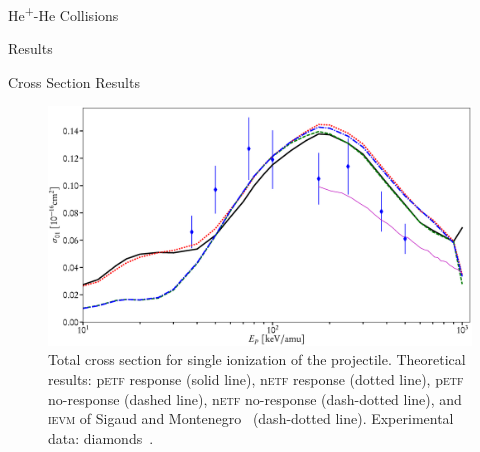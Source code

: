 \documentclass[letterpaper, 11 pt]{report}
\begin{document}
\begin{chapter}{\texorpdfstring{He\textsuperscript{+}}{He+}-He Collisions \label{chap:hephe}}
\begin{section}{Results \label{sec:hephe-disc}}
\begin{subsection}{Cross Section Results \label{sec:hephe-res}}
         \begin{figure}[t]
            \centering
            \includegraphics[width = \linewidth]{./images/hephe-cross/HepHe-201.eps}
            \caption[Total cross section for single ionization of the projectile in
                     He\textsuperscript{+}-He collisions.]
                    {Total cross section for single ionization of the projectile.
                     Theoretical results: p\textsc{etf} response (solid line), n\textsc{etf} response
                                          (dotted line), p\textsc{etf} no-response (dashed line),
                                          n\textsc{etf} no-response (dash-dotted line), and
                                          \textsc{ievm} of Sigaud and Montenegro~\cite{SM-03}
                                          (dash-dotted line).
                     Experimental data: diamonds~\cite{Dub-89}. \label{fig:cs201}}
         \end{figure}


\end{subsection}
\end{section}
\end{chapter}
\end{document}
